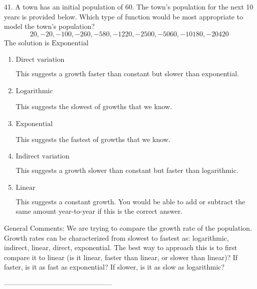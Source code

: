41. A town has an initial population of 60. The town's population for the next 10 years is provided below. Which type of function would be most appropriate to model the town's population?
$$ 20, -20, -100, -260, -580, -1220, -2500, -5060, -10180, -20420 $$ 
The solution is $ \text{Exponential} $ 

\begin{enumerate}[label=\Alph*.] 
\item $ \text{Direct variation} $ 

 This suggests a growth faster than constant but slower than exponential. 
\item $ \text{Logarithmic} $ 

 This suggests the slowest of growths that we know. 
\item $ \text{Exponential} $ 

 This suggests the fastest of growths that we know. 
\item $ \text{Indirect variation} $ 

 This suggests a growth slower than constant but faster than logarithmic. 
\item $ \text{Linear} $ 

 This suggests a constant growth. You would be able to add or subtract the same amount year-to-year if this is the correct answer. 
\end{enumerate} 
 
General Comments: We are trying to compare the growth rate of the population. Growth rates can be characterized from slowest to fastest as: logarithmic, indirect, linear, direct, exponential. The best way to approach this is to first compare it to linear (is it linear, faster than linear, or slower than linear)? If faster, is it as fast as exponential? If slower, is it as slow as logarithmic?

-----------------------------------------------

